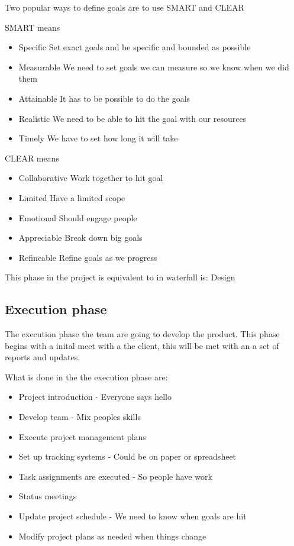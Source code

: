 \documentclass{article}
\begin{document}
Two popular ways to define goals are to use SMART and CLEAR 

SMART means
\begin{itemize}
    \item Specific Set exact goals and be specific and bounded as possible
    \item Measurable We need to set goals we can measure so we know when we did them
    \item Attainable It has to be possible to do the goals
    \item Realistic We need to be able to hit the goal with our resources
    \item Timely We have to set how long it will take
\end{itemize}

  
CLEAR means 
\begin{itemize}
    \item Collaborative Work together to hit goal
    \item Limited Have a limited scope
    \item Emotional Should engage people
    \item Appreciable Break down big goals
    \item Refineable Refine goals as we progress
\end{itemize}

This phase in the project is equivalent to in waterfall is: Design

\subsection{Execution phase}
The execution phase the team are going to develop the product. 
This phase begins with a inital meet with a the client, this will be met with an a set of reports and updates. 

What is done in the the execution phase are:
\begin{itemize}
    \item Project introduction - Everyone says hello 
    \item Develop team - Mix peoples skills
    \item Execute project management plans
    \item Set up tracking systems - Could be on paper or spreadsheet
    \item Task assignments are executed - So people have work
    \item Status meetings
    \item Update project schedule - We need to know when goals are hit
    \item Modify project plans as needed when things change
\end{itemize}
\end{document}
